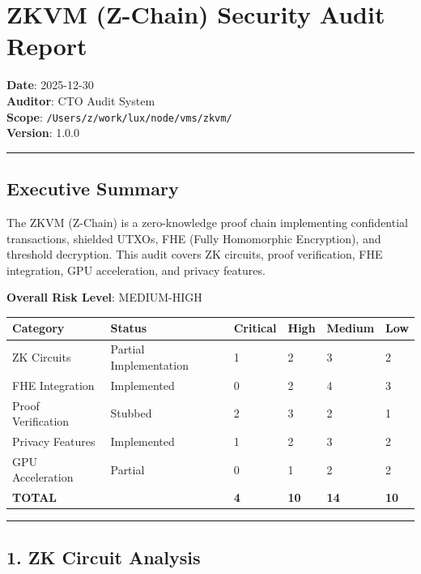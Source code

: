 \documentclass[
]{article}
\author{}
\date{}
\newcounter{none} %
\begin{document}
\section{ZKVM (Z-Chain) Security Audit
Report}\label{zkvm-z-chain-security-audit-report}

\textbf{Date}: 2025-12-30\\
\textbf{Auditor}: CTO Audit System\\
\textbf{Scope}: \texttt{/Users/z/work/lux/node/vms/zkvm/}\\
\textbf{Version}: 1.0.0

\begin{center}\rule{0.5\linewidth}{0.5pt}\end{center}

\subsection{Executive Summary}\label{executive-summary}

The ZKVM (Z-Chain) is a zero-knowledge proof chain implementing
confidential transactions, shielded UTXOs, FHE (Fully Homomorphic
Encryption), and threshold decryption. This audit covers ZK circuits,
proof verification, FHE integration, GPU acceleration, and privacy
features.

\textbf{Overall Risk Level}: MEDIUM-HIGH

{\def\LTcaptype{none} %
\begin{longtable}[]{@{}llllll@{}}
\toprule\noalign{}
Category & Status & Critical & High & Medium & Low \\
\midrule\noalign{}
\endhead
\bottomrule\noalign{}
\endlastfoot
ZK Circuits & Partial Implementation & 1 & 2 & 3 & 2 \\
FHE Integration & Implemented & 0 & 2 & 4 & 3 \\
Proof Verification & Stubbed & 2 & 3 & 2 & 1 \\
Privacy Features & Implemented & 1 & 2 & 3 & 2 \\
GPU Acceleration & Partial & 0 & 1 & 2 & 2 \\
\textbf{TOTAL} & & \textbf{4} & \textbf{10} & \textbf{14} &
\textbf{10} \\
\end{longtable}
}

\begin{center}\rule{0.5\linewidth}{0.5pt}\end{center}

\subsection{1. ZK Circuit Analysis}\label{1-zk-circuit-analysis}
\end{document}
